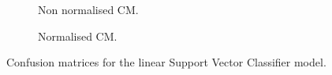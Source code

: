 \begin{figure}[ht]
    \centering
    \begin{subfigure}{.45\textwidth}
        \centering
        \captionsetup{width=0.9\linewidth}
        \captionsetup{justification=centering}
        \caption{Non normalised CM.}
    \end{subfigure}
    \hspace{1cm}
    \begin{subfigure}{.45\textwidth}
        \centering
        \captionsetup{width=0.9\linewidth}
        \captionsetup{justification=centering}
        \caption{Normalised CM.}
    \end{subfigure}
    \captionsetup{width=0.9\linewidth}
    \captionsetup{justification=centering}
    \caption{Confusion matrices for the linear Support Vector Classifier model.}
    \label{fig:ma_linsvc_cm}
\end{figure}